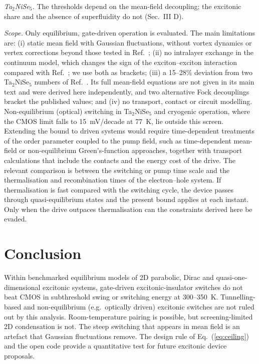 \documentclass[aip,jap,reprint,amsmath,amssymb]{revtex4-2}
\begin{document}
\textit{Ta$_2$NiSe$_5$.} The thresholds depend on the mean-field decoupling; the excitonic share and the absence of superfluidity do not
(Sec.~III D).

\textit{Scope.} Only equilibrium, gate-driven operation is evaluated. The main limitations are: (i) static
mean field with Gaussian fluctuations, without vortex dynamics or vertex corrections beyond those tested in
Ref.~; (ii) no intralayer exchange in the continuum model, which changes the sign of the
exciton--exciton interaction compared with Ref.~; we use both as brackets; (iii) a 15--28\%
deviation from two Ta$_2$NiSe$_5$ numbers of Ref.~. Its full mean-field equations are not given in its main text and were derived here independently, and two alternative Fock decouplings bracket the published values; and (iv) no transport, contact or circuit modelling. Non-equilibrium (optical) switching in Ta$_2$NiSe$_5$ and cryogenic
operation, where the CMOS limit falls to 15~mV/decade at 77~K, lie outside this screen. Extending the bound to driven systems would require
time-dependent treatments of the order parameter coupled to the pump field, such as time-dependent mean-field or non-equilibrium
Green's-function approaches, together with transport calculations that include the contacts and the energy cost of the drive. The relevant comparison is between the switching or pump time scale and the thermalisation and recombination times of the electron--hole system. If thermalisation is fast compared with the switching cycle, the device passes through quasi-equilibrium states and the present bound applies at each instant. Only when the drive outpaces thermalisation can the constraints derived here be evaded.

\section{Conclusion}
Within benchmarked equilibrium models of 2D parabolic, Dirac and quasi-one-dimensional excitonic systems, gate-driven
excitonic-insulator switches do not beat CMOS in subthreshold swing or switching energy at 300--350~K. Tunnelling-based and
non-equilibrium (e.g.\ optically driven) excitonic switches are not ruled out by this analysis. Room-temperature pairing is
possible, but screening-limited 2D condensation is not. The steep switching that appears in mean field is an
artefact that Gaussian fluctuations remove. The design rule of Eq.~(\ref{eq:ceiling}) and the open code provide
a quantitative test for future excitonic device proposals.
\end{document}
